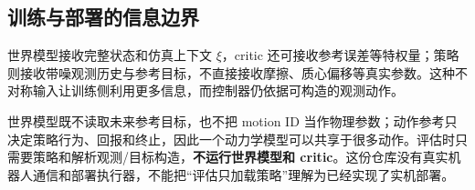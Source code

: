 \subsection{训练与部署的信息边界}
世界模型接收完整状态和仿真上下文 $\xi$，critic 还可接收参考误差等特权量；策略则接收带噪观测历史与参考目标，不直接接收摩擦、质心偏移等真实参数。这种不对称输入让训练侧利用更多信息，而控制器仍依据可构造的观测动作。

世界模型既不读取未来参考目标，也不把 motion ID 当作物理参数；动作参考只决定策略行为、回报和终止，因此一个动力学模型可以共享于很多动作。评估时只需要策略和解析观测/目标构造，\textbf{不运行世界模型和 critic}。这份仓库没有真实机器人通信和部署执行器，不能把“评估只加载策略”理解为已经实现了实机部署。

